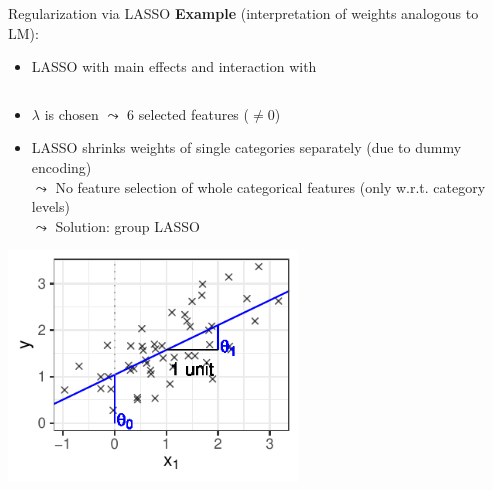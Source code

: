 \documentclass[10pt,compress,t,notes=noshow, xcolor=table]{beamer}
\begin{document}
\begin{frame}{Regularization via LASSO }
\textbf{Example} (interpretation of weights analogous to LM):

\begin{itemize}
    \item LASSO with main effects and interaction  with 
\end{itemize}
\vspace{-0.5\topsep}
\begin{columns}[c, totalwidth=\textwidth]
\begin{column}{0.65\textwidth}
\begin{itemize}
    \item $\lambda$ is chosen $\leadsto$ 6 selected features ($\neq 0$)
    \item LASSO shrinks weights of single categories separately (due to dummy encoding)\\
    $\leadsto$ No feature selection of whole categorical features (only w.r.t. category levels)\\
    $\leadsto$ Solution: group LASSO 
\end{itemize}
\smallskip
\centering
\includegraphics[width = 0.6\textwidth]{figure/reg_lm_plot_interpreted.pdf}

\end{column}
\begin{column}{0.35\textwidth}


\end{column}
\end{columns}
\end{frame}
\end{document}
